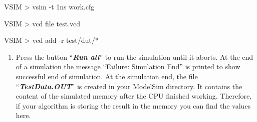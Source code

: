 \documentclass[
]{article}
\begin{document}
VSIM \textgreater{} vsim -t 1ns work.cfg

VSIM \textgreater{} vcd file test.vcd

VSIM \textgreater{} vcd add -r test/dut/*

\begin{enumerate}
\def\labelenumi{\arabic{enumi}.}
\setcounter{enumi}{18}
\item
  Press the button ``\emph{\textbf{Run all}}'' to run the simulation
  until it aborts. At the end of a simulation the message ``Failure:
  Simulation End'' is printed to show successful end of simulation. At
  the simulation end, the file ``\emph{\textbf{TestData.OUT}}'' is
  created in your ModelSim directory. It contains the content of the
  simulated memory after the CPU finished working. Therefore, if your
  algorithm is storing the result in the memory you can find the values
  here.
\end{enumerate}
\end{document}
